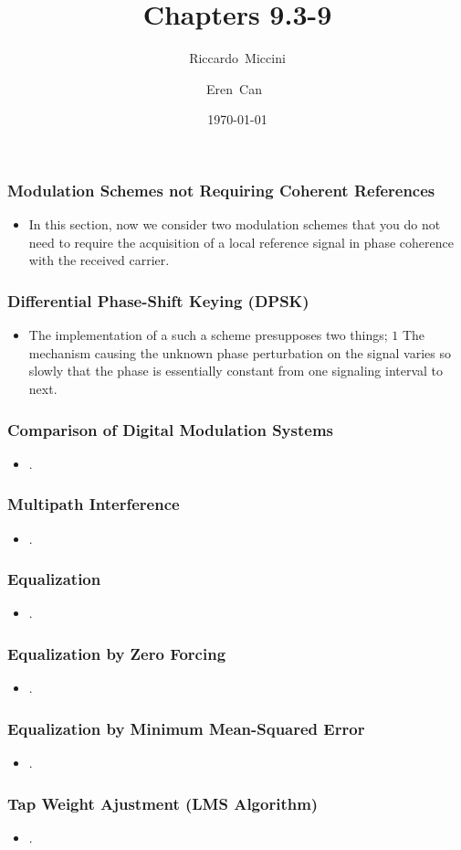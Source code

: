 \documentclass{beamer}
\title{Chapters 9.3-9}
\subtitle{}
\author[Riccardo \and Eren]{Riccardo~Miccini\inst{1} \and Eren~Can~\inst{1}}
\institute[DTU]
{
	\inst{1}
	Technical University of Denmark\\
	Digital Communication
}
\date{\today}
\begin{document}
\frame{\titlepage}

\begin{frame}
	\frametitle{Modulation Schemes not Requiring Coherent References}
	\begin{itemize}
		\item In this section, now we consider two modulation schemes that you do not need to require the acquisition of  a local reference signal in phase coherence with the received carrier. 
	\end{itemize}
\end{frame}

\begin{frame}
	\frametitle{Differential Phase-Shift Keying  (DPSK)}
	\begin{itemize}
		\item The implementation of a such a scheme presupposes two things;
		$1$ The mechanism causing the unknown phase perturbation on the signal varies so slowly that the phase is essentially constant from one signaling interval to next.
	\end{itemize}
\end{frame}


\begin{frame}
	\frametitle{Comparison of Digital Modulation Systems}
	\begin{itemize}
		\item .
	\end{itemize}
\end{frame}


\begin{frame}
	\frametitle{Multipath Interference}
	\begin{itemize}
		\item .
	\end{itemize}
\end{frame}


\begin{frame}
	\frametitle{Equalization}
	\begin{itemize}
		\item .
	\end{itemize}
\end{frame}

\begin{frame}
	\frametitle{Equalization by Zero Forcing}
	\begin{itemize}
		\item .
	\end{itemize}
\end{frame}

\begin{frame}
	\frametitle{Equalization by Minimum Mean-Squared Error}
	\begin{itemize}
		\item .
	\end{itemize}
\end{frame}

\begin{frame}
	\frametitle{Tap Weight Ajustment (LMS Algorithm)}
	\begin{itemize}
		\item .
	\end{itemize}
\end{frame}
\end{document}
